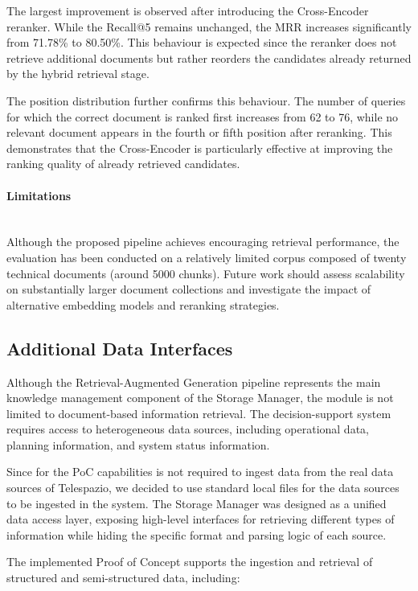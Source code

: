 The largest improvement is observed after introducing the Cross-Encoder reranker. While the Recall@5 remains unchanged, the MRR increases significantly from 71.78\% to 80.50\%. This behaviour is expected since the reranker does not retrieve additional documents but rather reorders the candidates already returned by the hybrid retrieval stage.

The position distribution further confirms this behaviour. The number of queries for which the correct document is ranked first increases from 62 to 76, while no relevant document appears in the fourth or fifth position after reranking. This demonstrates that the Cross-Encoder is particularly effective at improving the ranking quality of already retrieved candidates.



\paragraph{Limitations}~\\
Although the proposed pipeline achieves encouraging retrieval performance, the evaluation has been conducted on a relatively limited corpus composed of twenty technical documents (around 5000 chunks). Future work should assess scalability on substantially larger document collections and investigate the impact of alternative embedding models and reranking strategies.



\subsection{Additional Data Interfaces}

Although the Retrieval-Augmented Generation pipeline represents the main knowledge management component of the Storage Manager, the module is not limited to document-based information retrieval. The decision-support system requires access to heterogeneous data sources, including operational data, planning information, and system status information.

Since for the PoC capabilities is not required to ingest data from the real data sources of Telespazio, we decided to use standard local files for the data sources to be ingested in the system.
The Storage Manager was designed as a unified data access layer, exposing high-level interfaces for retrieving different types of information while hiding the specific format and parsing logic of each source.

The implemented Proof of Concept supports the ingestion and retrieval of structured and semi-structured data, including:

